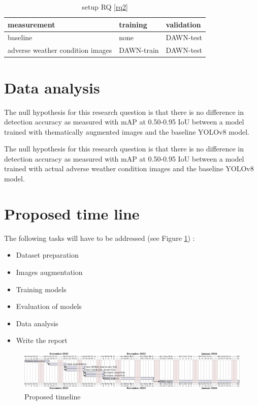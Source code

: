 \documentclass[]{article}
\begin{document}
	\begin{table}[!ht]
		\centering
		\begin{tabular}{lll}
			\toprule
			\textbf{measurement} & \textbf{training} & \textbf{validation} \\
			\midrule
			baseline & none & DAWN-test \\
			adverse weather condition images & DAWN-train & DAWN-test \\
			\bottomrule
		\end{tabular}
		\caption{setup RQ \ref{rq2}}
		\label{table:setuprq2}
	\end{table}

\section{Data analysis}

	The null hypothesis for this research question is that there is no difference in detection accuracy as measured with mAP at 0.50-0.95 IoU between a model trained with thematically augmented images and the baseline YOLO\small{v8} model.

	The null hypothesis for this research question is that there is no difference in detection accuracy as measured with mAP at 0.50-0.95 IoU between a model trained with actual adverse weather condition images and the baseline YOLO\small{v8} model.

\section{Proposed time line}

The following tasks will have to be addressed (see Figure \ref{fig:timeline}) :
\begin{itemize}
	\item Dataset preparation
	\item Images augmentation
	\item Training models
	\item Evaluation of models
	\item Data analysis
	\item Write the report
\end{itemize}

\begin{figure}[h]
	\centering
	\includegraphics[width=\textwidth]{proposal-timing}
	\caption{Proposed timeline}
	\label{fig:timeline}
\end{figure}

\printbibliography
\end{document}
